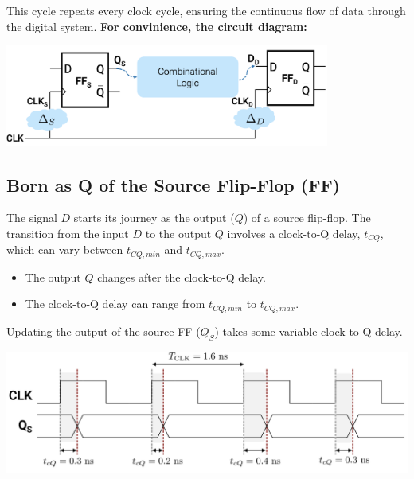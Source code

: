 \documentclass[12pt,openany]{book}
\begin{document}
\newline
This cycle repeats every clock cycle, ensuring the continuous flow of data through the digital system.
\newpage
\textbf{For convinience, the circuit diagram:}
\begin{center}
	\includegraphics[width=0.8\textwidth]{circuits/15.5.png}
\end{center}
\subsection{Born as Q of the Source Flip-Flop (FF)}
\begin{minipage}{0.45\textwidth}
    The signal $D$ starts its journey as the output ($Q$) of a source flip-flop. The transition from the input $D$ to the output $Q$ involves a clock-to-Q delay, $t_{CQ}$, which can vary between $t_{CQ,min}$ and $t_{CQ,max}$.

    \begin{itemize}
        \item[] The output $Q$ changes after the clock-to-Q delay.
        \item[] The clock-to-Q delay can range from $t_{CQ,min}$ to $t_{CQ,max}$.
    \end{itemize}

    Updating the output of the source FF ($Q_S$) takes some variable clock-to-Q delay.
\end{minipage}
\hfill
\vline
\hfill
\begin{minipage}{0.45\textwidth}
    \centering
    \includegraphics[width=1.3\textwidth]{circuits/15.4.1.png}
\end{minipage}
\end{document}
